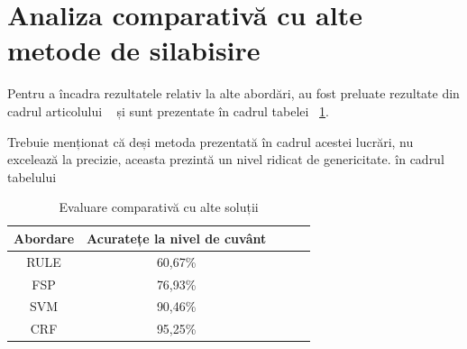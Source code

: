 \section{Analiza comparativă cu alte metode de silabisire}

Pentru a încadra rezultatele relativ la alte abordări, au fost preluate rezultate din cadrul articolului ~\cite{bib:dinu2013romanian} și sunt prezentate în cadrul tabelei ~\ref{table:comparison}. 

Trebuie menționat că deși metoda prezentată în cadrul acestei lucrări, nu excelează la precizie, aceasta prezintă un nivel ridicat de genericitate. în cadrul tabelului 

\begin{table}[t!]
\centering
\begin{tabular}{|c|c|c|c|c|}
\hline
Abordare & Acuratețe la nivel de cuvânt\\  
\hline
\hline
RULE & 60,67\%\\ 
\hline
\color{cyan} FSP & \color{cyan}76,93\% \\ 
\hline
SVM & 90,46\%\\ 
\hline
CRF & 95,25\%\\ 
\hline\end{tabular}
\caption{Evaluare comparativă cu alte soluții} 
\label{table:comparison}
\end{table}
